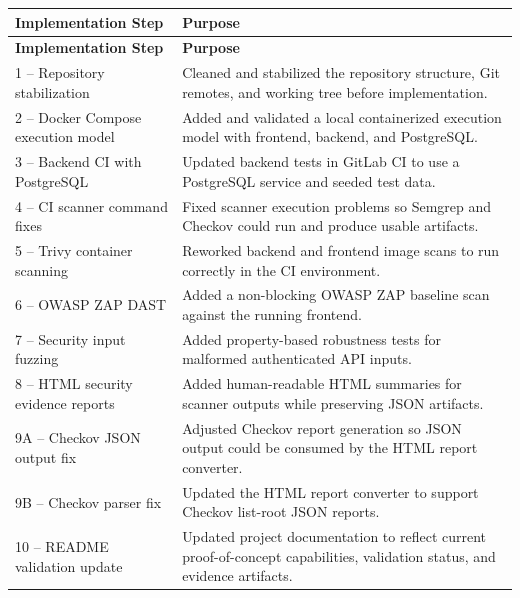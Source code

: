 \documentclass[12pt,a4paper]{report}
\begin{document}
\begin{longtable}{|p{6.2cm}|p{10cm}|}
\hline
\textbf{Implementation Step} & \textbf{Purpose} \\
\hline
\endfirsthead

\hline
\textbf{Implementation Step} & \textbf{Purpose} \\
\hline
\endhead

 1 -- Repository stabilization &
Cleaned and stabilized the repository structure, Git remotes, and working tree before implementation. \\
\hline

 2 -- Docker Compose execution model &
Added and validated a local containerized execution model with frontend, backend, and PostgreSQL. \\
\hline

 3 -- Backend CI with PostgreSQL &
Updated backend tests in GitLab CI to use a PostgreSQL service and seeded test data. \\
\hline

 4 -- CI scanner command fixes &
Fixed scanner execution problems so Semgrep and Checkov could run and produce usable artifacts. \\
\hline

 5 -- Trivy container scanning &
Reworked backend and frontend image scans to run correctly in the CI environment. \\
\hline

 6 -- OWASP ZAP DAST &
Added a non-blocking OWASP ZAP baseline scan against the running frontend. \\
\hline

 7 -- Security input fuzzing &
Added property-based robustness tests for malformed authenticated API inputs. \\
\hline

 8 -- HTML security evidence reports &
Added human-readable HTML summaries for scanner outputs while preserving JSON artifacts. \\
\hline

 9A -- Checkov JSON output fix &
Adjusted Checkov report generation so JSON output could be consumed by the HTML report converter. \\
\hline

 9B -- Checkov parser fix &
Updated the HTML report converter to support Checkov list-root JSON reports. \\
\hline

 10 -- README validation update &
Updated project documentation to reflect current proof-of-concept capabilities, validation status, and evidence artifacts. \\
\hline


\end{longtable}
\end{document}
